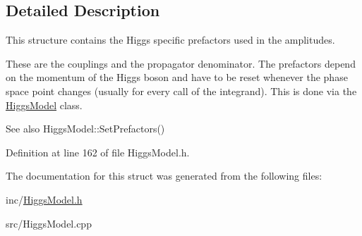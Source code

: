 \subsection{Detailed Description}
This structure contains the Higgs specific prefactors used in the amplitudes. 

These are the couplings and the propagator denominator. The prefactors depend on the momentum of the Higgs boson and have to be reset whenever the phase space point changes (usually for every call of the integrand). This is done via the \hyperlink{classHiggsModel}{Higgs\+Model} class. \begin{DoxySeeAlso}{See also}
Higgs\+Model\+::\+Set\+Prefactors() 
\end{DoxySeeAlso}


Definition at line 162 of file Higgs\+Model.\+h.



The documentation for this struct was generated from the following files\+:\begin{DoxyCompactItemize}
\item 
inc/\hyperlink{HiggsModel_8h}{Higgs\+Model.\+h}\item 
src/Higgs\+Model.\+cpp\end{DoxyCompactItemize}
